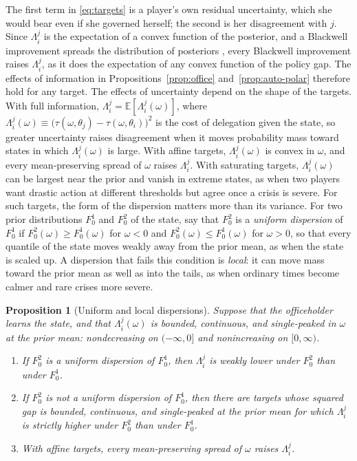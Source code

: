 \documentclass[12pt,letterpaper]{article}
\newtheorem{proposition}{Proposition}
\begin{document}
The first term in \eqref{eq:targets} is a player's own residual uncertainty, which she would bear even if she governed herself; the second is her disagreement with $j$. Since $\Lambda_i^j$ is the expectation of a convex function of the posterior, and a Blackwell improvement spreads the distribution of posteriors \citep{Blackwell1953}, every Blackwell improvement raises $\Lambda_i^j$, as it does the expectation of any convex function of the policy gap. The effects of information in Propositions~\ref{prop:office} and~\ref{prop:auto-polar} therefore hold for any target. The effects of uncertainty depend on the shape of the targets. With full information, $\Lambda_i^j=\mathbb{E}[\Lambda_i^j(\omega)]$, where $\Lambda_i^j(\omega)\equiv\big(\tau(\omega,\theta_j)-\tau(\omega,\theta_i)\big)^2$ is the cost of delegation given the state, so greater uncertainty raises disagreement when it moves probability mass toward states in which $\Lambda_i^j(\omega)$ is large. With affine targets, $\Lambda_i^j(\omega)$ is convex in $\omega$, and every mean-preserving spread \citep{RothschildStiglitz1970} of $\omega$ raises $\Lambda_i^j$. With saturating targets, $\Lambda_i^j(\omega)$ can be largest near the prior and vanish in extreme states, as when two players want drastic action at different thresholds but agree once a crisis is severe. For such targets, the form of the dispersion matters more than its variance. For two prior distributions $F_0^1$ and $F_0^2$ of the state, say that $F_0^2$ is a \emph{uniform dispersion} of $F_0^1$ if $F_0^2(\omega)\ge F_0^1(\omega)$ for $\omega<0$ and $F_0^2(\omega)\le F_0^1(\omega)$ for $\omega>0$, so that every quantile of the state moves weakly away from the prior mean, as when the state is scaled up. A dispersion that fails this condition is \emph{local}: it can move mass toward the prior mean as well as into the tails, as when ordinary times become calmer and rare crises more severe.

\begin{proposition}[Uniform and local dispersions]\label{prop:dispersion}
Suppose that the officeholder learns the state, and that $\Lambda_i^j(\omega)$ is bounded, continuous, and single-peaked in $\omega$ at the prior mean: nondecreasing on $(-\infty,0]$ and nonincreasing on $[0,\infty)$.
\begin{enumerate}
  \item[(a)] If $F_0^2$ is a uniform dispersion of $F_0^1$, then $\Lambda_i^j$ is weakly lower under $F_0^2$ than under $F_0^1$.
  \item[(b)] If $F_0^2$ is not a uniform dispersion of $F_0^1$, then there are targets whose squared gap is bounded, continuous, and single-peaked at the prior mean for which $\Lambda_i^j$ is strictly higher under $F_0^2$ than under $F_0^1$.
  \item[(c)] With affine targets, every mean-preserving spread of $\omega$ raises $\Lambda_i^j$.
\end{enumerate}
\end{proposition}
\end{document}
